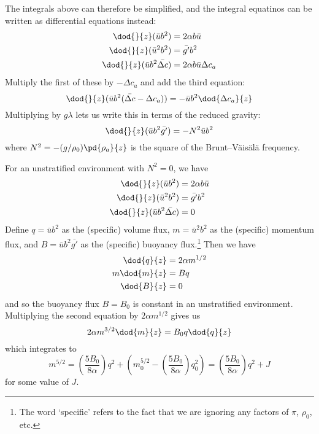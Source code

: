 The integrals above can therefore be simplified, and the integral equatinos can
be written as differential equations instead:
\begin{align}
    \dod{}{z}(\bar{u} b^2) &= 2\alpha b\bar{u} \\
    \dod{}{z}(\bar{u}^2 b^2) &= \bar{g'} b^2 \\
    \dod{}{z}(\bar{u} b^2 \bar{\Delta c}) &= 2\alpha b\bar{u} \Delta c_a
\end{align}
Multiply the first of these by $-\Delta c_a$ and add the third equation:
\begin{equation}
    \dod{}{z} (\bar{u} b^2 (\bar{\Delta c} - \Delta c_a)) = -\bar{u} b^2 \dod{\Delta c_a}{z} 
\end{equation}
Multiplying by $g \lambda$ lets us write this in terms of the reduced gravity:
\begin{equation}
    \dod{}{z}(\bar{u} b^2 \bar{g'}) = -N^2 \bar{u} b^2
\end{equation}
where $N^2 = -(g/\rho_0) \pd{\rho_a}{z}$ is the square of the
Brunt--V\"ais\"al\"a frequency.

For an unstratified environment with $N^2 = 0$, we have
\begin{align}
    \dod{}{z}(\bar{u} b^2) &= 2\alpha b\bar{u} \\
    \dod{}{z}(\bar{u}^2 b^2) &= \bar{g'} b^2 \\
    \dod{}{z}(\bar{u} b^2 \bar{\Delta c}) &= 0
\end{align}
Define $q = \bar{u}b^2$ as the (specific) volume flux, $m = \bar{u}^2 b^2$ as
the (specific) momentum flux, and $B = \bar{u}b^2 \bar{g'}$ as the (specific)
buoyancy flux.\footnote{The word `specific' refers to the fact that we are
ignoring any factors of $\pi$, $\rho_0$, etc.} Then we have
\begin{align}
    \dod{q}{z} &= 2\alpha m^{1/2} \\
    m\dod{m}{z} &= B q \\
    \dod{B}{z} &= 0
\end{align}
and so the buoyancy flux $B = B_0$ is constant in an unstratified environment.
Multiplying the second equation by $2\alpha m^{1/2}$ gives us
\begin{equation}
    2\alpha m^{3/2} \dod{m}{z} = B_0 q\dod{q}{z}
\end{equation}
which integrates to
\begin{equation}
    m^{5/2} = \left(\frac{5B_0}{8\alpha}\right) q^2 + \left( m_0^{5/2}
    - \left(\frac{5B_0}{8\alpha}\right) q_0^2 \right) 
    = \left(\frac{5B_0}{8\alpha}\right) q^2 + J
\end{equation}
for some value of $J$.

